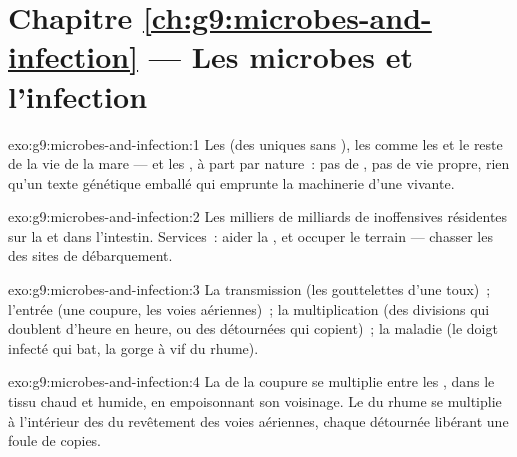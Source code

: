 \section*{Chapitre \ref{ch:g9:microbes-and-infection} --- Les microbes et l'infection}

\begin{solution}{exo:g9:microbes-and-infection:1}
Les  (des  uniques sans ), les
  comme les  et le reste de
la vie  de la mare --- et les , à part par
nature~: pas de , pas de vie propre, rien qu'un texte
génétique emballé qui emprunte la machinerie d'une 
vivante.
\end{solution}

\begin{solution}{exo:g9:microbes-and-infection:2}
Les milliers de milliards de  inoffensives
résidentes sur la  et dans l'intestin. Services~: aider
la , et occuper le terrain --- chasser les  des sites de débarquement.
\end{solution}

\begin{solution}{exo:g9:microbes-and-infection:3}
La transmission (les gouttelettes d'une toux)~; l'entrée
(une coupure, les voies aériennes)~; la multiplication (des
divisions qui doublent d'heure en heure, ou des 
détournées qui copient)~; la maladie (le doigt infecté qui
bat, la gorge à vif du rhume).
\end{solution}

\begin{solution}{exo:g9:microbes-and-infection:4}
La  de la coupure se multiplie entre les ,
dans le tissu chaud et humide, en empoisonnant son
voisinage. Le  du rhume se multiplie à l'intérieur des
 du revêtement des voies aériennes, chaque 
détournée libérant une foule de copies.
\end{solution}

